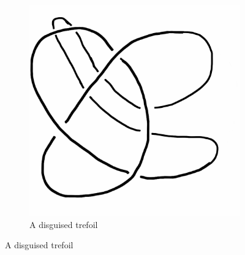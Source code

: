 \documentclass[12pt]{amsart}
\theoremstyle{definition}
\begin{document}
\begin{figure}[h]
\begin{subfigure}[b]{0.3\textwidth}
                \includegraphics[width=\textwidth]{knotpics/trefoil-wiggled.png}
                \caption{A disguised trefoil}
        \end{subfigure}
\end{figure}
\end{document}
